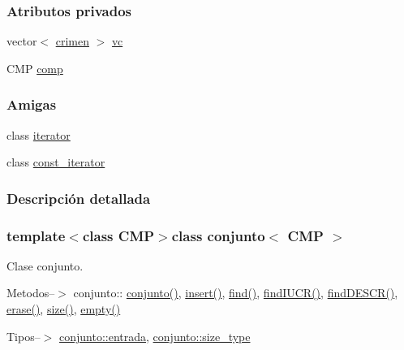 \subsubsection*{Atributos privados}
\begin{DoxyCompactItemize}
\item 
vector$<$ \hyperlink{classcrimen}{crimen} $>$ \hyperlink{classconjunto_a14cfd61d0d9f8e883d2b6042bb34c439}{vc}
\item 
C\-M\-P \hyperlink{classconjunto_af6b3ee8bd547ea0c444af56c5263adbe}{comp}
\end{DoxyCompactItemize}
\subsubsection*{Amigas}
\begin{DoxyCompactItemize}
\item 
class \hyperlink{classconjunto_a67171474c4da6cc8efe0c7fafefd2b2d}{iterator}
\item 
class \hyperlink{classconjunto_ac220ce1c155db1ac44146c12d178056f}{const\-\_\-iterator}
\end{DoxyCompactItemize}


\subsubsection{Descripción detallada}
\subsubsection*{template$<$class C\-M\-P$>$class conjunto$<$ C\-M\-P $>$}

Clase conjunto. 

Metodos--$>$ conjunto\-:\-: \hyperlink{classconjunto_ab634a250097d154d69a13bf8bde9fec7}{conjunto()}, \hyperlink{classconjunto_a61c22092268cc91439b93a2fd96e4173}{insert()}, \hyperlink{classconjunto_a61a1fbfcfdd54ee08879b0c6c1918f9c}{find()}, \hyperlink{classconjunto_a9a8dabd60a56147e10547a71b2320cb6}{find\-I\-U\-C\-R()}, \hyperlink{classconjunto_a52247b879aa00d67b660a3f1d72dc673}{find\-D\-E\-S\-C\-R()}, \hyperlink{classconjunto_a92332298c1202e92027b48f01c69ae91}{erase()}, \hyperlink{classconjunto_aa52964752a0e77c26f720f53e64ce818}{size()}, \hyperlink{classconjunto_a904716d6ae739f0461880b08138cf4e4}{empty()}

Tipos--$>$ \hyperlink{classconjunto_a7630ace7cb17bcec07daf5804f1a0780}{conjunto\-::entrada}, \hyperlink{classconjunto_a0cc9902da62790ec2a6d59f4559c2df5}{conjunto\-::size\-\_\-type}

